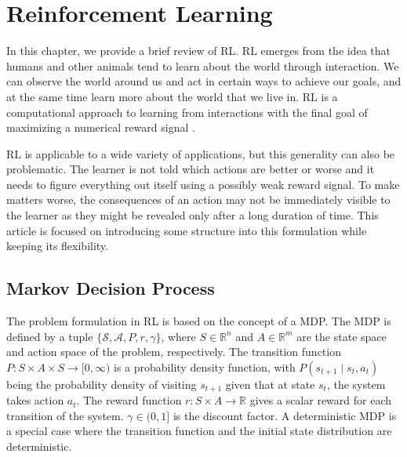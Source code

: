 \chapter{Reinforcement Learning}
\label{ch:background}



\label{sec:background_rl}

In this chapter, we provide a brief review of \acf{RL}. \ac{RL} emerges from the idea that humans and other animals tend to learn about the world through interaction. We can observe the world around us and act in certain ways to achieve our goals, and at the same time learn more about the world that we live in. \ac{RL} is a computational approach to learning from interactions with the final goal of maximizing a numerical reward signal \cite{rlbook}.

\ac{RL} is applicable to a wide variety of applications, but this generality can also be problematic.
The learner is not told which actions are better or worse and it needs to figure everything out itself using a possibly weak reward signal.
To make matters worse, the consequences of an action may not be immediately visible to the learner as they might be revealed only after a long duration of time.
This article is focused on introducing some structure into this formulation while keeping its flexibility.


\section{Markov Decision Process}

The problem formulation in \ac{RL} is based on the concept of a \ac{MDP}. The \ac{MDP} is defined by a tuple $\{\mathcal{S}, \mathcal{A}, P, r, \gamma\}$, where $S \in \mathbb R^n$ and $A \in \mathbb R^m$ are the state space and action space of the problem, respectively. The transition function $P: S \times A \times S \to [0, \infty)$ 
is a probability density function, with $P(s_{t+1} \mid s_t, a_t)$ being the probability density of visiting $s_{t+1}$ given that at state $s_t$, the system takes action $a_t$.
The reward function $r: S\times A \to \mathbb R$ gives a scalar reward for each transition of the system. 
$\gamma \in (0, 1]$ is the discount factor. A deterministic \ac{MDP} is a special case where the transition function and the initial state distribution are deterministic.

